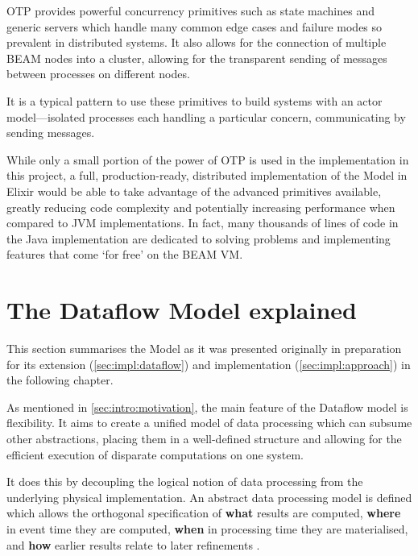 
OTP provides powerful concurrency primitives such as state machines and generic servers which handle many common edge cases and failure modes so prevalent in distributed systems.
It also allows for the connection of multiple BEAM nodes into a cluster, allowing for the transparent sending of messages between processes on different nodes.

It is a typical pattern to use these primitives to build systems with an actor model---isolated processes each handling a particular concern, communicating by sending messages.

While only a small portion of the power of OTP is used in the implementation in this project, a full, production-ready, distributed implementation of the Model in Elixir would be able to take advantage of the advanced primitives available, greatly reducing code complexity and potentially increasing performance when compared to JVM implementations.
In fact, many thousands of lines of code in the Java implementation are dedicated to solving problems and implementing features that come `for free' on the BEAM VM.

\section{The Dataflow Model explained}\label{sec:prep:dataflow}

This section summarises the Model as it was presented originally \cite{Akidau:2015} in preparation for its extension (\cref{sec:impl:dataflow}) and implementation (\cref{sec:impl:approach}) in the following chapter.

As mentioned in \cref{sec:intro:motivation}, the main feature of the Dataflow model is flexibility.
It aims to create a unified model of data processing which can subsume other abstractions, placing them in a well-defined structure and allowing for the efficient execution of disparate computations on one system.

It does this by decoupling the logical notion of data processing from the underlying physical implementation.
An abstract data processing model is defined which allows the orthogonal specification of \textbf{what} results are computed, \textbf{where} in event time they are computed, \textbf{when} in processing time they are materialised, and \textbf{how} earlier results relate to later refinements \cite[p.~1793]{Akidau:2015}.

